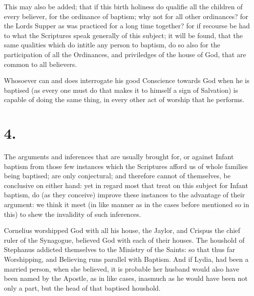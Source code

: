 \documentclass[12pt,a4paper]{book}
\begin{document}
This may also be added; that if this birth holiness do qualifie all the children of every believer, for the ordinance of baptism; why not for all other ordinances? for the Lords Supper as was practiced for a long time together? for if recourse be had to what the Scriptures speak generally of this subject; it will be found, that the same qualities which do intitle any person to baptism, do so also for the participation of all the Ordinances, and priviledges of the house of God, that are common to all believers.

Whosoever can and does interrogate his good Conscience towards God when he is baptised (as every one must do that makes it to himself a sign of Salvation) is capable of doing the same thing, in every other act of worship that he performs.

\section{4.}
The arguments and inferences that are usually brought for, or against Infant baptism from those few instances which the Scriptures afford us of whole families being baptised; are only conjectural; and therefore cannot of themselves, be conclusive on either hand: yet in regard most that treat on this subject for Infant baptism, do (as they conceive) improve these instances to the advantage of their argument: we think it meet (in like manner as in the cases before mentioned so in this) to shew the invalidity of such inferences.

Cornelius worshipped God with all his house, the Jaylor, and Crispus the chief ruler of the Synagogue, believed God with each of their houses. The houshold of Stephanus addicted themselves to the Ministry of the Saints: so that thus far Worshipping, and Believing runs parallel with Baptism. And if Lydia, had been a married person, when she believed, it is probable her husband would also have been named by the Apostle, as in like cases, inasmuch as he would have been not only a part, but the head of that baptised houshold.
\end{document}

